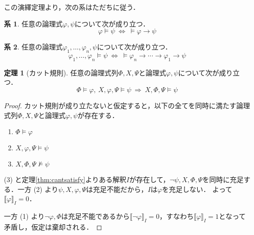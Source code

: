 \documentclass[uplatex,a4paper,dvipdfmx]{jsarticle}
\newcommand{\semvalue}[1]{\llbracket {#1} \rrbracket}
\theoremstyle{definition}
\newtheorem{thm}{定理}
\newtheorem{coro}{系}
\begin{document}
                この演繹定理より，次の系はただちに従う．
                \begin{coro}
                    任意の論理式$\varphi, \psi$について次が成り立つ．
                    \begin{equation}
                        \varphi \vDash \psi\ \Longleftrightarrow\ \vDash \varphi \to \psi
                    \end{equation}
                \end{coro}
                \begin{coro}
                    任意の論理式$\varphi_1, \ldots, \varphi_n, \psi$について次が成り立つ．
                    \begin{equation}
                        \varphi_1, \ldots, \varphi_n \vDash \psi\ \Longleftrightarrow\ \vDash \varphi_n \to \cdots \to \varphi_1 \to \psi
                    \end{equation}
                \end{coro}

                \begin{thm}[カット規則]
                    任意の論理式列$\Phi, X, \Psi$と論理式$\varphi, \psi$について次が成り立つ．
                    \begin{equation}
                        \Phi \vDash \varphi,\ X, \varphi, \Psi \vDash \psi\ \Longrightarrow\ X, \Phi, \Psi \vDash \psi
                    \end{equation}
                \end{thm}

                \begin{proof}
                    カット規則が成り立たないと仮定すると，以下の全てを同時に満たす論理式列$\Phi, X, \Psi$と論理式$\varphi, \psi$が存在する．
                    \begin{enumerate}
                        \item $\Phi \vDash \varphi$
                        \item $X, \varphi, \Psi \vDash \psi$
                        \item $X, \Phi, \Psi \not\vDash \psi$
                    \end{enumerate}

                    (3) と定理\ref{thm:cantsatisfy}よりある解釈$I$が存在して，$\lnot\psi, X, \Phi, \Psi$を同時に充足する．一方 (2) より$\psi, X, \varphi, \Psi$は充足不能だから，$I$は$\varphi$を充足しない．
                    よって$\semvalue{\varphi}_I = 0$．

                    一方 (1) より$\lnot\varphi, \Phi$は充足不能であるから$\semvalue{\lnot\varphi}_I = 0$，すなわち$\semvalue{\varphi}_I = 1$となって矛盾し，仮定は棄却される．
                \end{proof}
\end{document}
